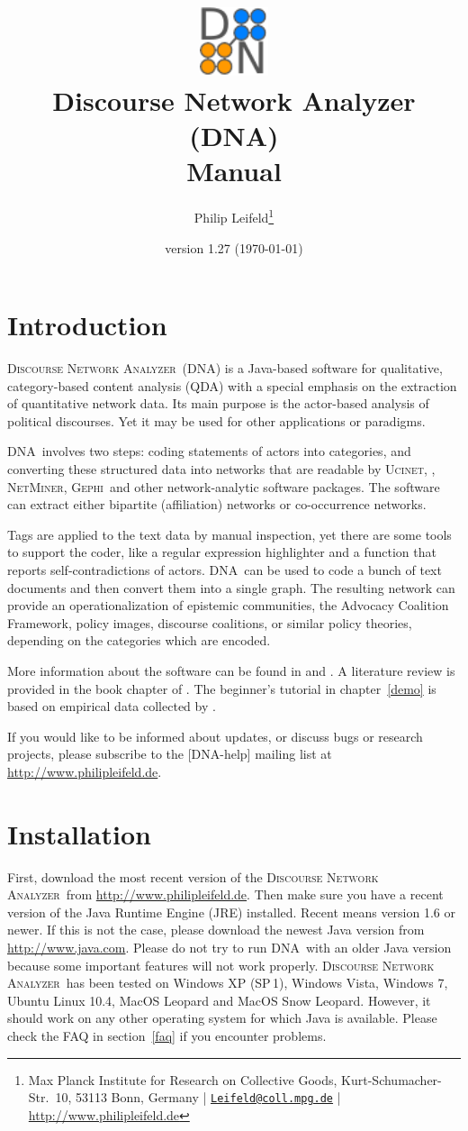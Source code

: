 \documentclass[12pt,a4paper]{scrreprt}
\author{Philip Leifeld\footnote{Max Planck Institute for Research on Collective Goods, Kurt-Schumacher-Str.~10, 53113 Bonn, Germany | \href{mailto:Leifeld@coll.mpg.de}{\texttt{Leifeld@coll.mpg.de}} | \url{http://www.philipleifeld.de}}}
\title{\includegraphics[width=2cm]{dna32.pdf}\\ \vspace{0.5cm} Discourse Network Analyzer (DNA)\\ \vspace{0.3cm} \textbf{Manual}}
\date{version 1.27 (\today)}
\newcommand{\visone}
{\textsf%
 {\protect\raisebox{.5ex}{\color[rgb]{0.1,0.1,0.1}v}%
  \protect\raisebox{.1ex}{\color[rgb]{0.3,0.3,0.3}i}%
  \protect\raisebox{-.1ex}{\color[rgb]{0.1,0.1,0.1}s}%
  \protect\raisebox{.1ex}{\color[rgb]{0.3,0.3,0.3}o}%
  \protect\raisebox{-.1ex}{\color[rgb]{0.1,0.1,0.1}n}%
  \protect\raisebox{-.4ex}{\color[rgb]{0.3,0.3,0.3}e}%
 }%
}
\newcommand{\ucinet}{\textsc{Ucinet}}
\newcommand{\dnalong}{\textsc{Discourse} \textsc{Network} \textsc{Analyzer}}
\newcommand{\dnashort}{\textsc{DNA}}
\newcommand{\netminer}{\textsc{NetMiner}}
\newcommand{\gephi}{\textsc{Gephi}}
\begin{document}
\maketitle
\setcounter{tocdepth}{2}
\tableofcontents

\chapter{Introduction}
\dnalong\ (\dnashort) is a Java-based software for qualitative, category-based content analysis (QDA) with a special emphasis on the extraction of quantitative network data. Its main purpose is the actor-based analysis of political discourses. Yet it may be used for other applications or paradigms.

\dnashort\ involves two steps: coding statements of actors into categories, and converting these structured data into networks that are readable by \ucinet, \visone, \netminer, \gephi\ and other network-analytic software packages. The software can extract either bipartite (affiliation) networks or co-occurrence networks.

Tags are applied to the text data by manual inspection, yet there are some tools to support the coder, like a regular expression highlighter and a function that reports self-contradictions of actors. \dnashort\ can be used to code a bunch of text documents and then convert them into a single graph. The resulting network can provide an operationalization of epistemic communities, the Advocacy Coalition Framework, policy images, discourse coalitions, or similar policy theories, depending on the categories which are encoded.

More information about the software can be found in \citet{leifeld2009die,leifeld2010political} and \citet{leifeld2010comparison}. A literature review is provided in the book chapter of \citet{janning2009diskursnetzwerkanalyse.}. The beginner's tutorial in chapter~\ref{demo} is based on empirical data collected by \citet{fisher2009understanding}.

If you would like to be informed about updates, or discuss bugs or research projects, please subscribe to the [DNA-help] mailing list at \url{http://www.philipleifeld.de}.


\chapter{Installation}\label{installation}
First, download the most recent version of the \dnalong\ from \url{http://www.philipleifeld.de}. Then make sure you have a recent version of the Java Runtime Engine (JRE) installed. Recent means version 1.6 or newer. If this is not the case, please download the newest Java version from \url{http://www.java.com}. Please do not try to run \dnashort\ with an older Java version because some important features will not work properly. \dnalong\ has been tested on Windows XP (SP\,1), Windows Vista, Windows 7, Ubuntu Linux 10.4, MacOS Leopard and MacOS Snow Leopard. However, it should work on any other operating system for which Java is available. Please check the FAQ in section~\ref{faq} if you encounter problems.
\end{document}
